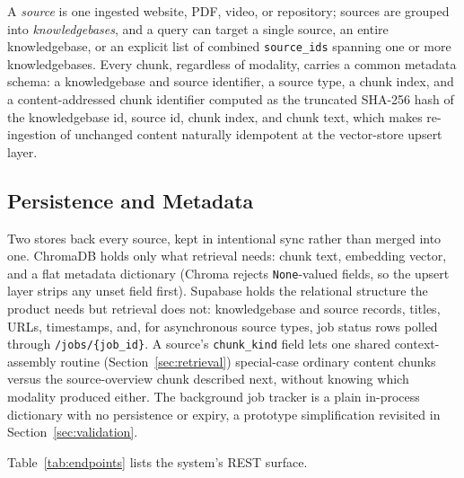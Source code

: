 \documentclass[conference]{IEEEtran}
\begin{document}
A \emph{source} is one ingested website, PDF, video, or repository; sources are grouped into \emph{knowledgebases}, and a query can target a single source, an entire knowledgebase, or an explicit list of combined \texttt{source\_ids} spanning one or more knowledgebases. Every chunk, regardless of modality, carries a common metadata schema: a knowledgebase and source identifier, a source type, a chunk index, and a content-addressed chunk identifier computed as the truncated SHA-256 hash of the knowledgebase id, source id, chunk index, and chunk text, which makes re-ingestion of unchanged content naturally idempotent at the vector-store upsert layer.

\subsection{Persistence and Metadata}
Two stores back every source, kept in intentional sync rather than merged into one. ChromaDB holds only what retrieval needs: chunk text, embedding vector, and a flat metadata dictionary (Chroma rejects \texttt{None}-valued fields, so the upsert layer strips any unset field first). Supabase holds the relational structure the product needs but retrieval does not: knowledgebase and source records, titles, URLs, timestamps, and, for asynchronous source types, job status rows polled through \texttt{/jobs/\{job\_id\}}. A source's \texttt{chunk\_kind} field lets one shared context-assembly routine (Section~\ref{sec:retrieval}) special-case ordinary content chunks versus the source-overview chunk described next, without knowing which modality produced either. The background job tracker is a plain in-process dictionary with no persistence or expiry, a prototype simplification revisited in Section~\ref{sec:validation}.

Table~\ref{tab:endpoints} lists the system's REST surface.
\end{document}
